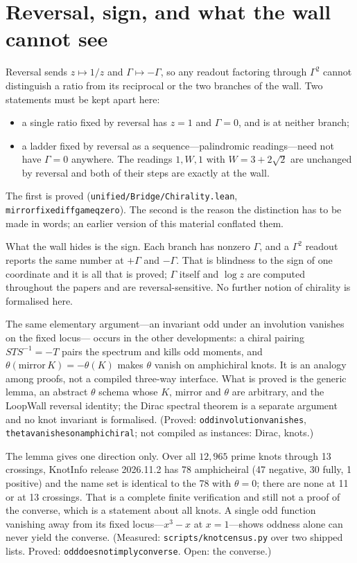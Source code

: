 \documentclass[11pt]{article}
\newcommand{\G}{\Gamma}
\renewcommand{\_}{\origunderscore\allowbreak}
\newcommand{\W}{3+2\sqrt{2}}
\begin{document}
\section{Reversal, sign, and what the wall cannot see}

Reversal sends $z\mapsto 1/z$ and $\G\mapsto-\G$, so any readout factoring through $\G^2$ cannot
distinguish a ratio from its reciprocal or the two branches of the wall. Two statements must be
kept apart here:
\begin{itemize}
\item a single ratio fixed by reversal has $z=1$ and $\G=0$, and is at neither branch;
\item a ladder fixed by reversal as a sequence---palindromic readings---need not have $\G=0$
  anywhere. The readings $1,W,1$ with $W=\W$ are unchanged by reversal and both of their steps are
  exactly at the wall.
\end{itemize}
The first is proved (\texttt{unified/Bridge/Chirality.lean},
\texttt{mirror\_fixed\_iff\_gam\_eq\_zero}). The second is the reason the distinction has to be
made in words; an earlier version of this material conflated them.

What the wall hides is the sign. Each branch has nonzero $\G$, and a $\G^2$ readout reports the
same number at $+\G$ and $-\G$. That is blindness to the sign of one coordinate and it is all that
is proved; $\G$ itself and $\log z$ are computed throughout the papers and are reversal-sensitive.
No further notion of chirality is formalised here.

The same elementary argument---an invariant odd under an involution vanishes on the fixed locus---
occurs in the other developments: a chiral pairing $STS^{-1}=-T$ pairs the spectrum and kills odd
moments, and $\theta(\text{mirror}\,K)=-\theta(K)$ makes $\theta$ vanish on amphichiral knots. It
is an analogy among proofs, not a compiled three-way interface. What is proved is the generic
lemma, an abstract $\theta$ schema whose $K$, mirror and $\theta$ are arbitrary, and the LoopWall
reversal identity; the Dirac spectral theorem is a separate argument and no knot invariant is
formalised. (Proved: \texttt{odd\_involution\_vanishes},
\texttt{theta\_vanishes\_on\_amphichiral}; not compiled as instances: Dirac, knots.)

The lemma gives one direction only. Over all $12{,}965$ prime knots through 13 crossings, KnotInfo
release 2026.11.2 has 78 amphicheiral (47 negative, 30 fully, 1 positive) and the name set is
identical to the 78 with $\theta=0$; there are none at 11 or at 13 crossings. That is a complete
finite verification and still not a proof of the converse, which is a statement about all knots. A
single odd function vanishing away from its fixed locus---$x^3-x$ at $x=1$---shows oddness alone
can never yield the converse. (Measured: \texttt{scripts/knot\_census.py} over two shipped lists.
Proved: \texttt{odd\_does\_not\_imply\_converse}. Open: the converse.)
\end{document}
